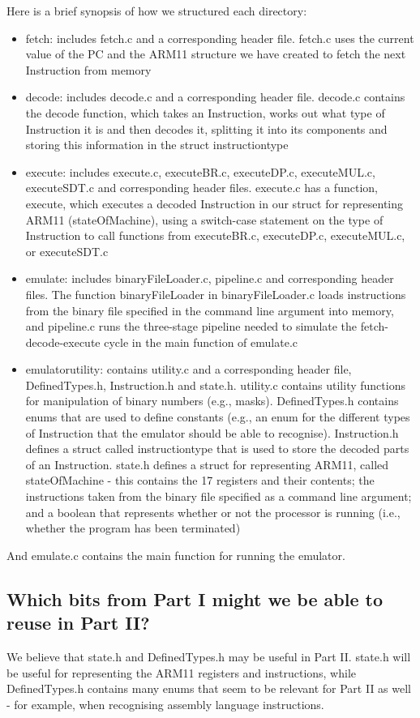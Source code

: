 \documentclass[letterpaper,11pt]{article}
\begin{document}
\noindent Here is a brief synopsis of how we structured each directory:

\begin{itemize}
    \item fetch: includes fetch.c and a corresponding header file. fetch.c uses the current value of the PC and the ARM11 structure we have created to fetch the next Instruction from memory
    \item decode: includes decode.c and a corresponding header file. decode.c contains the decode function, which takes an Instruction, works out what type of Instruction it is and then decodes it, splitting it into its components and storing this information in the struct instructiontype
    \item execute: includes execute.c, executeBR.c, executeDP.c, executeMUL.c, executeSDT.c and corresponding header files. execute.c has a function, execute, which executes a decoded Instruction in our struct for representing ARM11 (stateOfMachine), using a switch-case statement on the type of Instruction to call functions from executeBR.c, executeDP.c, executeMUL.c, or executeSDT.c
    \item emulate: includes binaryFileLoader.c, pipeline.c and corresponding header files. The function binaryFileLoader in binaryFileLoader.c loads instructions from the binary file specified in the command line argument into memory, and pipeline.c runs the three-stage pipeline needed to simulate the fetch-decode-execute cycle in the main function of emulate.c
    \item emulatorutility: contains utility.c and a corresponding header file, DefinedTypes.h, Instruction.h and state.h. utility.c contains utility functions for manipulation of binary numbers (e.g., masks). DefinedTypes.h contains enums that are used to define constants (e.g., an enum for the different types of Instruction that the emulator should be able to recognise). Instruction.h defines a struct called instructiontype that is used to store the decoded parts of an Instruction. state.h defines a struct for representing ARM11, called stateOfMachine - this contains the 17 registers and their contents; the instructions taken from the binary file specified as a command line argument; and a boolean that represents whether or not the processor is running (i.e., whether the program has been terminated)
\end{itemize}
And emulate.c contains the main function for running the emulator.

\subsection{Which bits from Part I might we be able to reuse in Part II?}
We believe that state.h and DefinedTypes.h may be useful in Part II. state.h will be useful for representing the ARM11 registers and instructions, while DefinedTypes.h contains many enums that seem to be relevant for Part II as well - for example, when recognising assembly language instructions.
\end{document}
